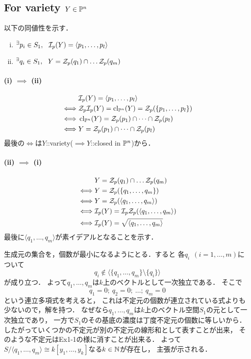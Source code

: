 \documentclass[a4paper]{jsarticle}
\begin{document}
    \subsection{For variety $Y \in \mathbb{P}^n$}
    以下の同値性を示す．
    \begin{enumerate}[(i)]
        \item ${}^{\exists} p_i \in S_1,~~ \mathcal{I}_p(Y)=\langle p_1, \dots, p_l \rangle$
        \item ${}^{\exists} q_i \in S_1,~~ Y=\mathcal{Z}_p(q_1) \cap \dots \mathcal{Z}_p(q_m)$
    \end{enumerate}
    \paragraph{(i) $\implies$ (ii)}
    \begin{align*}
            &   \mathcal{I}_p(Y)=\langle p_1, \dots, p_l \rangle \\
        \iff&   \mathcal{Z}_p \mathcal{I}_p(Y)=\operatorname{cl}_{\mathbb{P}^n}(Y)=\mathcal{Z}_p(\{ p_1, \dots, p_l \}) \\
        \iff&   \operatorname{cl}_{\mathbb{P}^n}(Y)=\mathcal{Z}_p(p_1)\cap \dots \cap \mathcal{Z}_p(p_l) \\
        \iff&   Y=\mathcal{Z}_p(p_1)\cap \dots \cap \mathcal{Z}_p(p_l)
    \end{align*}
    最後の$\iff$は$Y$::variety($\implies Y$::closed in $\mathbb{P}^n$)から．

    \paragraph{(ii) $\implies$ (i)}
    \begin{align*}
            &   Y=\mathcal{Z}_p(q_1) \cap \dots \mathcal{Z}_p(q_m) \\
        \iff&   Y=\mathcal{Z}_p(\{q_1, \dots, q_m \}) \\
        \iff&   Y=\mathcal{Z}_p(\langle q_1, \dots, q_m \rangle) \\
        \iff&   \mathcal{I}_p(Y)=\mathcal{I}_p \mathcal{Z}_p(\langle q_1, \dots, q_m \rangle) \\
        \iff&   \mathcal{I}_p(Y)=\sqrt{\langle q_1, \dots, q_m \rangle}
    \end{align*}
    最後に$\langle q_1, \dots, q_m \rangle$が素イデアルとなることを示す．
    
    生成元の集合を，個数が最小になるようにとる．すると
    各$q_i~~(i=1,\dots,m)$について
    \[ q_i \not \in \langle \{q_1, \dots, q_m\} \setminus \{q_i\} \rangle \]が成り立つ．
    よって$q_1, \dots, q_m$は$k$上のベクトルとして一次独立である．
    そこで
    \[ q_1=0;~ q_2=0;~ \dots;~ q_m=0 \]
    という連立多項式を考えると，
    これは不定元の個数が連立されている式よりも少ないので，解を持つ．
    なぜなら$q_1, \dots, q_m$は$k$上のベクトル空間$S_1$の元として一次独立であり，
    一方で$S_1$のその基底の濃度は丁度不定元の個数に等しいから．
    したがっていくつかの不定元が別の不定元の線形和として表すことが出来，
    そのような不定元はEx1-1の様に消すことが出来る．
    よって$S/\langle q_1, \dots, q_m \rangle \cong k[y_1,\dots,y_k]$なる$k \in \mathbb{N}$が存在し，
    主張が示される．
\end{document}

